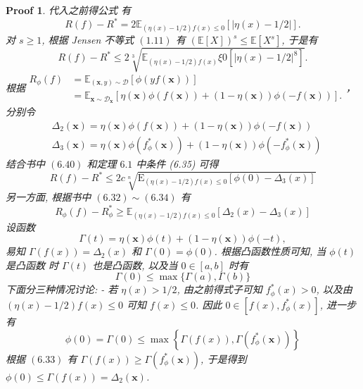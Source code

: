 \documentclass[a4paper,UTF8]{article}
\numberwithin{equation}{section}
\newtheorem*{myProof}{Proof}
\begin{document}
\begin{myProof}
		代入之前得公式 有
		$$
		R(f)-R^{*}=2 \mathbb{E}_{(\eta(x)-1 / 2) f(x) \leqslant 0}[|\eta(x)-1 / 2|] .
		$$
		对 $s \geqslant 1$, 根据 Jensen 不等式 $(1.11)$ 有 $(\mathbb{E}[X])^{s} \leqslant \mathbb{E}\left[X^{s}\right]$, 于是有
		$$
		R(f)-R^{*} \leqslant 2 \sqrt[3]{\mathbb{E}_{(\eta(x)-1 / 2) f(x)} \xi 0\left[|\eta(x)-1 / 2|^{8}\right]} .
		$$
		根据$\begin{aligned} R_{\phi}(f) &=\mathbb{E}_{(\boldsymbol{x}, y) \sim \mathcal{D}}[\phi(y f(\boldsymbol{x}))] \\ &=\mathbb{E}_{\boldsymbol{x} \sim \mathcal{D}_{\boldsymbol{x}}}[\eta(\boldsymbol{x}) \phi(f(\boldsymbol{x}))+(1-\eta(\boldsymbol{x})) \phi(-f(\boldsymbol{x}))] . \end{aligned}$， 分别令
		$$
		\begin{aligned}
			&\Delta_{2}(\boldsymbol{x})=\eta(\boldsymbol{x}) \phi(f(\boldsymbol{x}))+(1-\eta(\boldsymbol{x})) \phi(-f(\boldsymbol{x})) \\
			&\Delta_{3}(\boldsymbol{x})=\eta(\boldsymbol{x}) \phi\left(f_{\phi}^{*}(\boldsymbol{x})\right)+(1-\eta(\boldsymbol{x})) \phi\left(-f_{\phi}^{*}(\boldsymbol{x})\right)
		\end{aligned}
		$$
		结合书中 $(6.40)$ 和定理 $6.1$ 中条件 (6.35) 可得
		$$
		R(f)-R^{*} \leqslant 2 c \sqrt[n]{\mathrm{E}_{(\eta(x)-1 / 2) f(x) \leqslant 0}\left[\phi(0)-\Delta_{3}(x)\right]}
		$$
		另一方面, 根据书中 $(6.32) \sim(6.34)$ 有
		$$
		R_{\phi}(f)-R_{\phi}^{*} \geqslant \mathbb{E}_{(\eta(x)-1 / 2) f(x) \leqslant 0}\left[\Delta_{2}(x)-\Delta_{3}(x)\right]
		$$
		设函数
		$$
		\Gamma(t)=\eta(\boldsymbol{x}) \phi(t)+(1-\eta(\boldsymbol{x})) \phi(-t),
		$$
		易知 $\Gamma(f(x))=\Delta_{2}(x)$ 和 $\Gamma(0)=\phi(0)$. 根据凸函数性质可知, 当 $\phi(t)$ 是凸函数 时 $\Gamma(t)$ 也是凸函数, 以及当 $0 \in[a, b]$ 时有
		$$
		\Gamma(0) \leqslant \max \{\Gamma(a), \Gamma(b)\}
		$$
		下面分三种情况讨论:
		- 若 $\eta(x)>1 / 2$, 由之前得式子可知 $f_{\phi}^{*}(x)>0$, 以及由 $(\eta(x)-1 / 2) f(x) \leqslant 0$ 可知 $f(x) \leqslant 0$. 因此 $0 \in\left[f(x), f_{\phi}^{*}(x)\right]$, 进一步有
		$$
		\phi(0)=\Gamma(0) \leqslant \max \left\{\Gamma(f(x)), \Gamma\left(f_{\phi}^{*}(\boldsymbol{x})\right)\right\}
		$$
		根据 $(6.33)$ 有 $\Gamma(f(x)) \geqslant \Gamma\left(f_{\phi}^{*}(\boldsymbol{x})\right)$, 于是得到 $\phi(0) \leqslant \Gamma(f(x))=\Delta_{2}(\boldsymbol{x})$.
		

\end{myProof}
\end{document}
